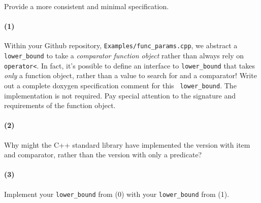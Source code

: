 \documentclass[12pt,letterpaper,twoside]{article}
\begin{document}
Provide a more consistent and minimal specification.

\newpage


\paragraph{(1)} Within your Github repository, {\tt Examples/func\_params.cpp},
we abstract a {\tt lower\_bound} to take a \emph{comparator
function object} rather than always rely on {\tt operator<}. 
In fact, it's possible to define an interface to {\tt lower\_bound} that takes
\emph{only} a function object, rather than a value to search for and a
comparator!
Write out a complete doxygen specification comment for this {\tt
  lower\_bound}. The implementation is not required. Pay special attention to
the signature and requirements of the function object.


\paragraph{(2)} Why might the C++ standard library have implemented the version with item and comparator, rather than the version with only a predicate?


\paragraph{(3)} Implement your {\tt lower\_bound} from (0) with your {\tt lower\_bound} from (1).
\end{document}
